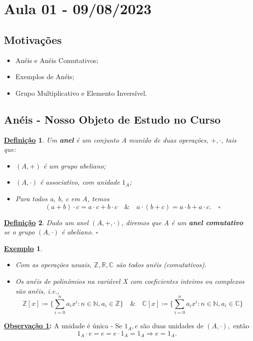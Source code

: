 \documentclass{article}
\newtheorem*{def*}{\underline{Defini\c c\~ao}}
\newtheorem{example}{\underline{Exemplo}}
\begin{document}
\section{Aula 01 - 09/08/2023}
\subsection{Motivações}
\begin{itemize}
  \item Anéis e Anéis Comutativos;
  \item Exemplos de Anéis;
  \item Grupo Multiplicativo e Elemento Inversível.
\end{itemize}
\subsection{Anéis - Nosso Objeto de Estudo no Curso}
\begin{def*}
  Um \textbf{anel} é um conjunto A munido de duas operações, \(+, \cdot \), tais que:
  \begin{itemize}
    \item[1)] \((A, +)\) é um grupo abeliano;
    \item[2)] \((A, \cdot )\) é associativo, com unidade \(1_{A}\);
    \item[3)] Para todos a, b, c em A, temos 
      \[
        (a+b)\cdot c = a \cdot c + b \cdot c \quad\&\quad a \cdot (b+c) = a \cdot b + a \cdot c.\quad\square
      \]
  \end{itemize}
\end{def*}
\begin{def*}
  Dado um anel \((A, +, \cdot )\), diremos que A é um \textbf{anel comutativo} se o grupo \((A, \cdot )\) é abeliano. \(\square\)
\end{def*}
\begin{example}
  \begin{itemize}
    \item[1)] Com as operações usuais, \(\mathbb{Z}, \mathbb{R}, \mathbb{C}\) são todos anéis (comutativos).
    \item[2)] Os anéis de polinômios na variável X com coeficientes inteiros ou complexos são anéis, i.e., 
      \[
        \mathbb{Z}[x]\coloneqq \biggl\{\sum\limits_{i=0}^{n}a_{i}x^{i}: n\in \mathbb{N}, a_{i}\in \mathbb{Z}\biggr\}\quad\&\quad \mathbb{C}[x]\coloneqq \biggl\{\sum\limits_{i=0}^{n}a_{i}x^{i}:n\in \mathbb{N}, a_{i}\in \mathbb{C}\biggr\}
      \]
  \end{itemize}
\end{example}
\textbf{\underline{Observação 1}:} A unidade é única - Se \(1_{A}, e\) são duas unidades de \((A, \cdot ),\) então 
\[
  1_{A}\cdot e = e = e \cdot 1_{A} = 1_{A} \Rightarrow e = 1_{A}.
\]
\end{document}
